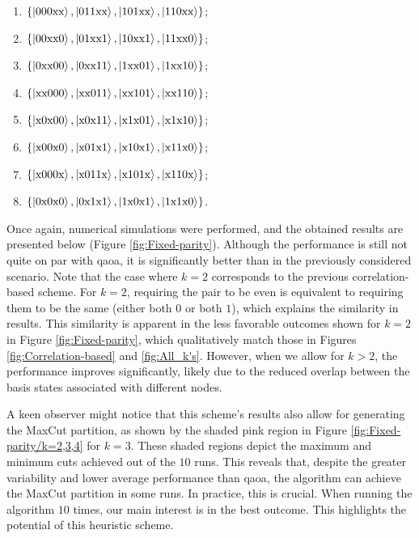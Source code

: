 \begin{multicols}{2}
  \begin{enumerate}
    \item $\left\{\ket{000\text{xx}}, \ket{011\text{xx}}, \ket{101\text{xx}}, \ket{110\text{xx}}\right\}$;
    \item $\left\{\ket{00\text{xx}0}, \ket{01\text{xx}1}, \ket{10\text{xx}1}, \ket{11\text{xx}0}\right\}$;
    \item $\left\{\ket{0\text{xx}00}, \ket{0\text{xx}11}, \ket{1\text{xx}01}, \ket{1\text{xx}10}\right\}$;
    \item $\left\{\ket{\text{xx}000}, \ket{\text{xx}011}, \ket{\text{xx}101}, \ket{\text{xx}110}\right\}$;
    \item $\left\{\ket{\text{x}0\text{x}00}, \ket{\text{x}0\text{x}11}, \ket{\text{x}1\text{x}01}, \ket{\text{x}1\text{x}10}\right\}$;
    \item $\left\{\ket{\text{x}00\text{x}0}, \ket{\text{x}01\text{x}1}, \ket{\text{x}10\text{x}1}, \ket{\text{x}11\text{x}0}\right\}$;
    \item $\left\{\ket{\text{x}000\text{x}}, \ket{\text{x}011\text{x}}, \ket{\text{x}101\text{x}}, \ket{\text{x}110\text{x}}\right\}$;
    \item $\left\{\ket{0\text{x}0\text{x}0}, \ket{0\text{x}1\text{x}1}, \ket{1\text{x}0\text{x}1}, \ket{1\text{x}1\text{x}0}\right\}$.
  \end{enumerate}
\end{multicols}
\noindent Once again, numerical simulations were performed, and the obtained results are presented below (Figure \ref{fig:Fixed-parity}). Although the performance is still not quite on par with \acrshort{qaoa}, it is significantly better than in the previously considered scenario. Note that the case where $k=2$ corresponds to the previous correlation-based scheme. For $k=2$, requiring the pair to be even is equivalent to requiring them to be the same (either both $0$ or both $1$), which explains the similarity in results. This similarity is apparent in the less favorable outcomes shown for $k=2$ in Figure \ref{fig:Fixed-parity}, which qualitatively match those in Figures \ref{fig:Correlation-based} and \ref{fig:All_k's}. However, when we allow for $k>2$, the performance improves significantly, likely due to the reduced overlap between the basis states associated with different nodes.

A keen observer might notice that this scheme's results also allow for generating the MaxCut partition, as shown by the shaded pink region in Figure \ref{fig:Fixed-parity/k=2,3,4} for $k=3$. These shaded regions depict the maximum and minimum cuts achieved out of the $10$ runs. This reveals that, despite the greater variability and lower average performance than \acrshort{qaoa}, the algorithm can achieve the MaxCut partition in some runs. In practice, this is crucial. When running the algorithm $10$ times, our main interest is in the best outcome. This highlights the potential of this heuristic scheme.

